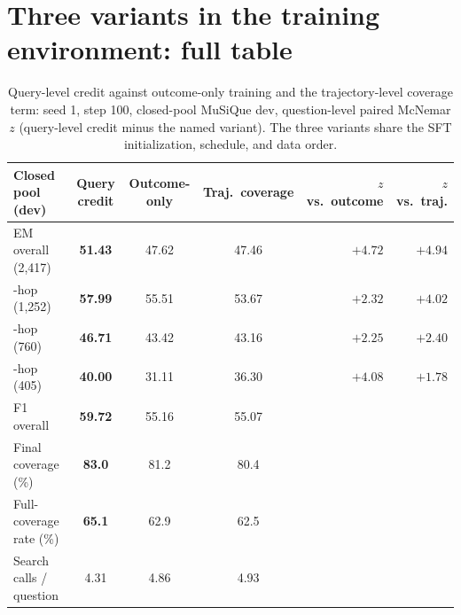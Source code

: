 \section{Three variants in the training environment: full table}
\label{app:main-table}

\begin{table}[t]
\centering
\small
\begin{tabular}{lcccrr}
\toprule
Closed pool (dev) & Query credit & Outcome-only & Traj.\ coverage &
$z$ vs.\ outcome & $z$ vs.\ traj. \\
\midrule
EM overall (2{,}417)   & \textbf{51.43} & 47.62 & 47.46 & $+4.72$ & $+4.94$ \\
\quad 2-hop (1{,}252)  & \textbf{57.99} & 55.51 & 53.67 & $+2.32$ & $+4.02$ \\
\quad 3-hop (760)      & \textbf{46.71} & 43.42 & 43.16 & $+2.25$ & $+2.40$ \\
\quad 4-hop (405)      & \textbf{40.00} & 31.11 & 36.30 & $+4.08$ & $+1.78$ \\
F1 overall             & \textbf{59.72} & 55.16 & 55.07 & & \\
Final coverage (\%)    & \textbf{83.0}  & 81.2  & 80.4  & & \\
Full-coverage rate (\%) & \textbf{65.1} & 62.9  & 62.5  & & \\
Search calls / question & 4.31 & 4.86 & 4.93 & & \\
\bottomrule
\end{tabular}
\caption{Query-level credit against outcome-only training and the
trajectory-level coverage term: seed 1, step 100, closed-pool MuSiQue
dev, question-level paired McNemar $z$ (query-level credit minus the
named variant). The three variants share the SFT initialization, schedule, and
data order.}
\label{tab:main-qc}
\end{table}


